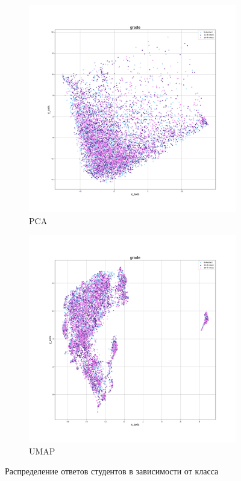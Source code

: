 \begin{figure}[H]
    \centering
    \begin{subfigure}{.5\textwidth}
      \centering
      \includegraphics[width=\linewidth]{../img/students_PCA_grade.png}
      \caption{PCA}
      \label{img::students::grade::PCA}
    \end{subfigure}%
    \begin{subfigure}{.5\textwidth}
      \centering
      \includegraphics[width=\linewidth]{../img/students_UMAP_grade.png}
      \caption{UMAP}
      \label{img::students::grade::UMAP}
    \end{subfigure}
    \caption{Распределение ответов студентов в зависимости от класса}
\end{figure}

